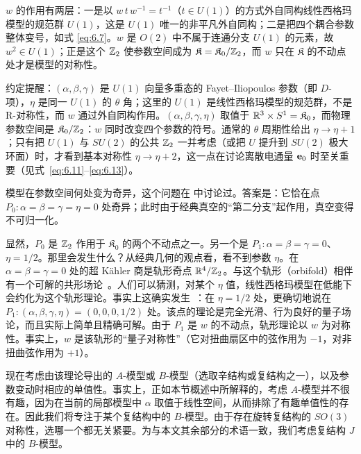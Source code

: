 \begin{yizhu}[易错点]$w$ 的作用有两层：一是以 $w\,t\,w^{-1}=t^{-1}$（$t\in U(1)$）的方式外自同构线性西格玛模型的规范群 $U(1)$，这是 $U(1)$ 唯一的非平凡外自同构；二是把四个耦合参数整体变号，如式 \eqref{eq:6.7}。$w$ 是 $O(2)$ 中不属于连通分支 $U(1)$ 的元素，故 $w^2\in U(1)$；正是这个 ${\mathbb{Z}}_2$ 使参数空间成为 $\mathfrak K=\mathfrak K_0/{\mathbb{Z}}_2$，而 $w$ 只在 $\mathfrak K$ 的不动点处才是模型的对称性。\end{yizhu}


\begin{yizhu}[易错点]约定提醒：$(\alpha,\beta,\gamma)$ 是 $U(1)$ 向量多重态的 Fayet–Iliopoulos 参数（即 $D$-项），$\eta$ 是同一 $U(1)$ 的 $\theta$ 角；这里的 $U(1)$ 是线性西格玛模型的规范群，不是 R-对称性，而 $w$ 通过外自同构作用。$(\alpha,\beta,\gamma,\eta)$ 取值于 ${\mathbb{R}}^3\times S^1=\mathfrak{K}_0$，而物理参数空间是 $\mathfrak{K}_0/{\mathbb{Z}}_2$：$w$ 同时改变四个参数的符号。通常的 $\theta$ 周期性给出 $\eta\to\eta+1$；只有把 $U(1)$ 与 $SU(2)$ 的公共 ${\mathbb{Z}}_2$ 一并考虑（或把 $U$ 提升到 $SU(2)$ 极大环面）时，才看到基本对称性 $\eta\to\eta+2$，这一点在讨论离散电通量 ${\bf e}_0$ 时至关重要（见式~\eqref{eq:6.11}--\eqref{eq:6.13}）。\end{yizhu}

模型在参数空间何处变为奇异，这个问题在 \cite{ref81} 中讨论过。答案是：它恰在点 $P_0:\alpha=\beta=\gamma=\eta=0$ 处奇异；此时由于经典真空的“第二分支”起作用，真空变得不可归一化。

显然，$P_0$ 是 ${\mathbb{Z}}_2$ 作用于 $\mathfrak{K}_0$ 的两个不动点之一。另一个是 $P_1:\alpha=\beta=\gamma=0$、$\eta=1/2$。那里会发生什么？{}从经典几何的观点看，看不到参数 $\eta$。在 $\alpha=\beta=\gamma=0$ 处的超 Kähler 商是轨形奇点 ${\mathbb{R}}^4/{\mathbb{Z}}_2$。与这个轨形（orbifold）相伴有一个可解的共形场论~\cite{ref83}。人们可以猜测，对某个 $\eta$ 值，线性西格玛模型在低能下会约化为这个轨形理论。事实上这确实发生~\cite{ref84}：在 $\eta=1/2$ 处，更确切地说在 $P_1:(\alpha,\beta,\gamma,\eta)=(0,0,0,1/2)$ 处。该点的理论是完全光滑、行为良好的量子场论，而且实际上简单且精确可解。由于 $P_1$ 是 $w$ 的不动点，轨形理论以 $w$ 为对称性。事实上，$w$ 是该轨形的“量子对称性”（它对扭曲扇区中的弦作用为 $-1$，对非扭曲弦作用为 $+1$）。

现在考虑由该理论导出的 $A$-模型或 $B$-模型（选取辛结构或复结构之一），以及参数变动时相应的单值性。事实上，正如本节概述中所解释的，考虑 $A$-模型并不很有趣，因为在当前的局部模型中 $\alpha$ 取值于线性空间，从而排除了有趣单值性的存在。因此我们将专注于某个复结构中的 $B$-模型。由于存在旋转复结构的 $SO(3)$ 对称性，选哪一个都无关紧要。为与本文其余部分的术语一致，我们考虑复结构 $J$ 中的 $B$-模型。

